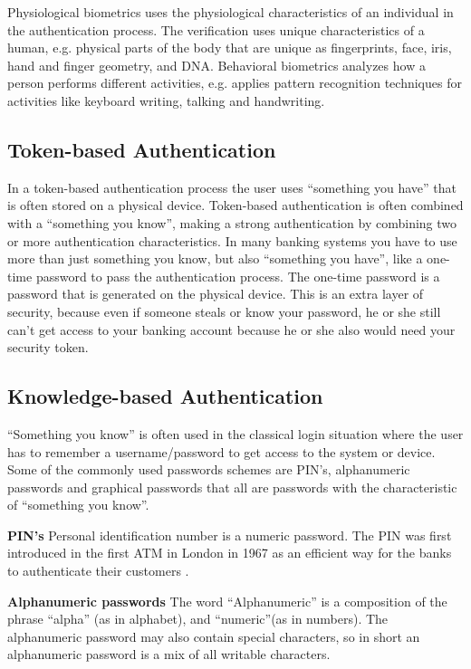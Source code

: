     Physiological biometrics uses the physiological characteristics of an individual in the authentication process. The verification uses unique characteristics of a human, e.g. physical parts of the body that are unique as fingerprints, face, iris, hand and finger geometry, and DNA. Behavioral biometrics analyzes how a person performs different activities, e.g. applies pattern recognition techniques for activities like keyboard writing, talking and handwriting.

    \subsection{Token-based Authentication}
    In a token-based authentication process the user uses ``something you have'' that is often stored on a physical device. Token-based authentication is often combined with a ``something you know'', making a strong authentication by combining two or more authentication characteristics. In many banking systems you have to use more than just something you know, but also ``something you have'', like a one-time password to pass the authentication process. The one-time password is a password that is generated on the physical device. This is an extra layer of security, because even if someone steals or know your password, he or she still can't get access to your banking account because he or she also would need your security token.

    \subsection{Knowledge-based Authentication}
    ``Something you know'' is often used in the classical login situation where the user has to remember a username/password to get access to the system or device. Some of the commonly used passwords schemes are PIN's, alphanumeric passwords and graphical passwords that all are passwords with the characteristic of ``something you know''.

      {\bf PIN's} Personal identification number is a numeric password. The PIN was first introduced in the first ATM in London in 1967 as an efficient way for the banks to authenticate their customers \cite{Bonneau1}.

      {\bf Alphanumeric passwords}
      The word ``Alphanumeric'' is a composition of the phrase ``alpha'' (as in alphabet), and ``numeric''(as in numbers). The alphanumeric password may also contain special characters, so in short an alphanumeric password is a mix of all writable characters.


